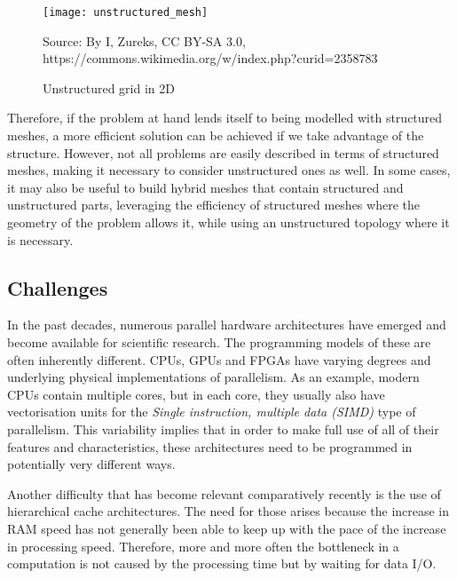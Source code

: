 \documentclass[fontsize=11pt, appendixprefix=true]{scrreprt}
\begin{document}
\begin{figure}
    \centering
    \texttt{[image: unstructured\_mesh]}
    \caption{Unstructured grid in 2D}
    \label{fig:unstructured_mesh}

    \small Source: By I, Zureks, CC BY-SA 3.0, %
    https://commons.wikimedia.org/w/index.php?curid=2358783
\end{figure}

Therefore, if the problem at hand lends itself to being modelled with structured
meshes, a more efficient solution can be achieved if we take advantage of the
structure. However, not all problems are easily described in terms of structured
meshes, making it necessary to consider unstructured ones as well. In some
cases, it may also be useful to build hybrid meshes that contain structured and
unstructured parts, leveraging the efficiency of structured meshes where the
geometry of the problem allows it, while using an unstructured topology where it
is necessary.

\subsection{Challenges}
In the past decades, numerous parallel hardware architectures have emerged and
become available for scientific research. The programming models of these are
often inherently different. CPUs, GPUs and FPGAs have varying degrees and
underlying physical implementations of parallelism. As an example, modern CPUs
contain multiple cores, but in each core, they usually also have vectorisation
units for the \textit{Single instruction, multiple data (SIMD)} type of
parallelism. This variability implies that in order to make full use of all of
their features and characteristics, these architectures need to be programmed in
potentially very different ways.

Another difficulty that has become relevant comparatively recently is the use of
hierarchical cache architectures. The need for those arises because the increase
in RAM speed has not generally been able to keep up with the pace of the
increase in processing speed. Therefore, more and more often the bottleneck in a
computation is not caused by the processing time but by waiting for data I/O.
\end{document}
